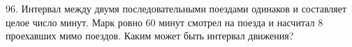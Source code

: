 96. Интервал между двумя последовательными поездами одинаков и составляет целое число минут. Марк ровно 60 минут смотрел на поезда и насчитал 8 проехавших мимо поездов. Каким может быть интервал движения?\\
